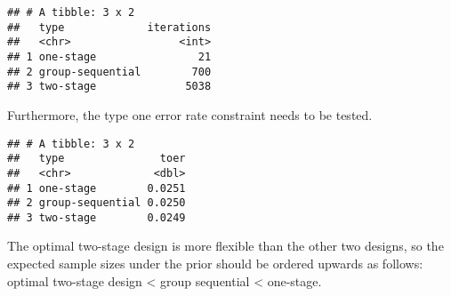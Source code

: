 \documentclass[
]{book}
\newenvironment{Shaded}{\begin{snugshade}}{\end{snugshade}}
\newcommand{\AttributeTok}[1]{\textcolor[rgb]{0.77,0.63,0.00}{#1}}
\newcommand{\DecValTok}[1]{\textcolor[rgb]{0.00,0.00,0.81}{#1}}
\newcommand{\FunctionTok}[1]{\textcolor[rgb]{0.00,0.00,0.00}{#1}}
\newcommand{\NormalTok}[1]{#1}
\newcommand{\SpecialCharTok}[1]{\textcolor[rgb]{0.00,0.00,0.00}{#1}}
\begin{document}
\begin{verbatim}
## # A tibble: 3 x 2
##   type             iterations
##   <chr>                 <int>
## 1 one-stage                21
## 2 group-sequential        700
## 3 two-stage              5038
\end{verbatim}

Furthermore, the type one error rate constraint needs to be tested.

\begin{Shaded}
\end{Shaded}

\begin{verbatim}
## # A tibble: 3 x 2
##   type               toer
##   <chr>             <dbl>
## 1 one-stage        0.0251
## 2 group-sequential 0.0250
## 3 two-stage        0.0249
\end{verbatim}

The optimal two-stage design is more flexible than the other two designs, so the expected sample sizes under the prior should be ordered upwards as follows: optimal two-stage design \textless{} group sequential \textless{} one-stage.
\end{document}
